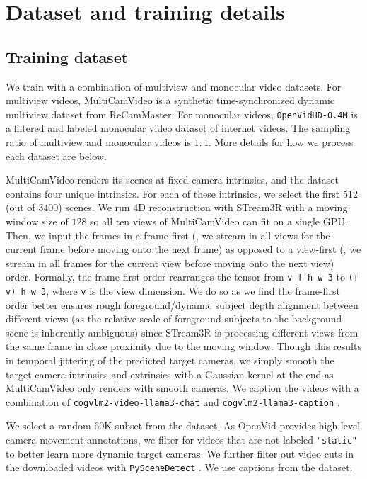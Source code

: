 \section{Dataset and training details}
\label{sec:supp_train_data}

\subsection{Training dataset}

We train with a combination of multiview and monocular video datasets. For multiview videos, MultiCamVideo \cite{bai2025recammaster} is a synthetic time-synchronized dynamic multiview dataset from ReCamMaster. For monocular videos, \texttt{OpenVidHD-0.4M} \cite{nan2025openvid} is a filtered and labeled monocular video dataset of internet videos. The sampling ratio of multiview and monocular videos is $1:1$. More details for how we process each dataset are below.

 MultiCamVideo renders its scenes at fixed camera intrinsics, and the dataset contains four unique intrinsics. For each of these intrinsics, we select the first $512$ (out of $3400$) scenes. We run 4D reconstruction with STream3R \cite{lan2025stream3r} with a moving window size of $128$ so all ten views of MultiCamVideo can fit on a single GPU. Then, we input the frames in a frame-first (\ie, we stream in all views for the current frame before moving onto the next frame) as opposed to a view-first (\ie, we stream in all frames for the current view before moving onto the next view) order. Formally, the frame-first order rearranges the tensor from \texttt{v f h w 3} to \texttt{(f v) h w 3}, where \texttt{v} is the view dimension. We do so as we find the frame-first order better ensures rough foreground/dynamic subject depth alignment between different views (as the relative scale of foreground subjects to the background scene is inherently ambiguous) since STream3R is processing different views from the same frame in close proximity due to the moving window. Though this results in temporal jittering of the predicted target cameras, we simply smooth the target camera intrinsics and extrinsics with a Gaussian kernel at the end as MultiCamVideo only renders with smooth cameras. We caption the videos with a combination of \texttt{cogvlm2-video-llama3-chat} and \texttt{cogvlm2-llama3-caption} \cite{hong2024cogvlm2, yang2025cogvideox}.

 We select a random 60K subset from the dataset. As OpenVid provides high-level camera movement annotations, we filter for videos that are not labeled \texttt{"static"} to better learn more dynamic target cameras. We further filter out video cuts in the downloaded videos with \texttt{PySceneDetect} \cite{castellano2025pyscenedetect}. We use captions from the dataset.


